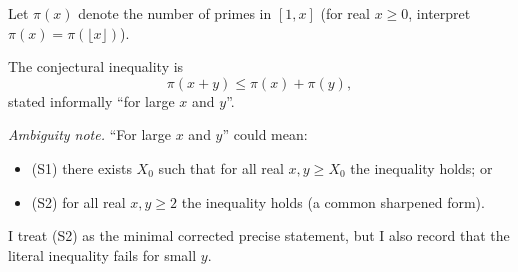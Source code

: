 Let $\pi(x)$ denote the number of primes in $[1,x]$ (for real $x\ge 0$, interpret $\pi(x)=\pi(\lfloor x\rfloor)$).

The conjectural inequality is
\[
  \pi(x+y) \le \pi(x)+\pi(y),
\]
stated informally ``for large $x$ and $y$''.

\emph{Ambiguity note.} ``For large $x$ and $y$'' could mean:
\begin{itemize}
\item (S1) there exists $X_0$ such that for all real $x,y\ge X_0$ the inequality holds; or
\item (S2) for all real $x,y\ge 2$ the inequality holds (a common sharpened form).
\end{itemize}
I treat (S2) as the minimal corrected precise statement, but I also record that the literal inequality fails for small $y$.
